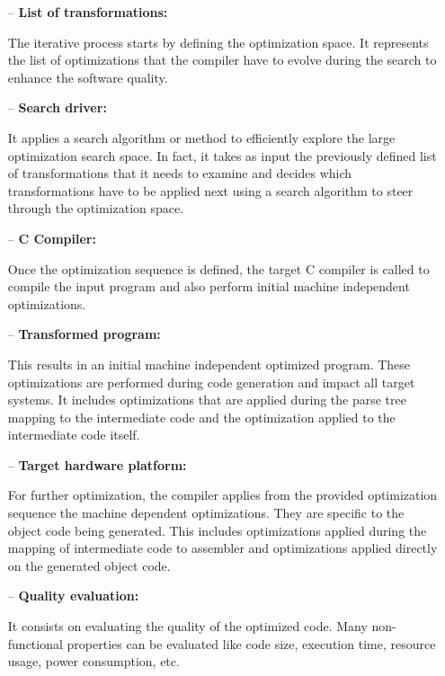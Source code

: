 \begin{itemize}
	\item[--] \textbf{List of transformations:}
	
	The iterative process starts by defining the optimization space. It represents the list of optimizations that the compiler have to evolve during the search to enhance the software quality.
	
	\item[--] \textbf{Search driver:}
	
	It applies a search algorithm or method to efficiently explore the large optimization search space. In fact, it takes as input the previously defined list of transformations that it needs to examine and decides which transformations have to be applied next using a search algorithm
	to steer through the optimization space.
	
	\item[--] \textbf{C Compiler:}
	
	Once the optimization sequence is defined, the target C compiler is called to compile the input program and also perform initial machine independent optimizations. 
	
	\item[--] \textbf{Transformed program:}
	
	This results in an initial machine independent optimized program. These optimizations are performed during code generation and impact all target systems. It includes optimizations that are applied during the parse tree mapping to the intermediate code and the optimization applied to the intermediate code itself.
	
	\item[--] \textbf{Target hardware platform:}
	
	For further optimization, the compiler applies from the provided optimization sequence the machine dependent optimizations. They are specific to the object code being generated. This includes optimizations applied during the mapping of intermediate code to assembler and optimizations applied directly on the generated object code.
	
	\item[--] \textbf{Quality evaluation:}
	
	It consists on evaluating the quality of the optimized code. Many non-functional properties can be evaluated like code size, execution time, resource usage, power consumption, etc.
	
\end{itemize}

